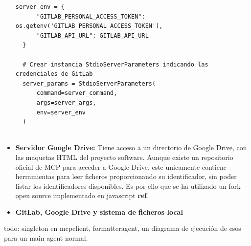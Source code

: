 \begin{itemize}
\begin{lstlisting}[caption={Instanciado de StdioServerParameters para el servidor MCP de GitLab},label={lst:mcpgitlab}]
  server_env = {
      "GITLAB_PERSONAL_ACCESS_TOKEN": os.getenv('GITLAB_PERSONAL_ACCESS_TOKEN'),
      "GITLAB_API_URL": GITLAB_API_URL
  }

  # Crear instancia StdioServerParameters indicando las credenciales de GitLab
  server_params = StdioServerParameters(
      command=server_command,
      args=server_args,
      env=server_env
  )
  
\end{lstlisting}

\item\textbf{Servidor Google Drive: }Tiene acceso a un directorio de Google Drive, con las maquetas HTML del proyecto software. Aunque existe un repositorio oficial de MCP para acceder a Google Drive, este unicamente contiene herramientas para leer ficheros proporcionando su identificador, sin poder listar los identificadores disponibles. Es por ello que se ha utilizado un fork open source implementado en javascript \textbf{ref}. 



  \item\textbf{GitLab, Google Drive y sistema de ficheros local}
\end{itemize}










todo: singleton en mcpclient, formatteragent, un diagrama de ejecución de esos para un main agent normal.
